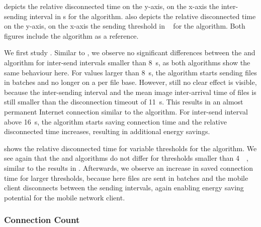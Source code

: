  depicts the relative disconnected time \relativeDisconnectedTime on the y-axis, on the x-axis the inter-sending interval in \si{\second} for the \algointerval algorithm. 
 also depicts the relative disconnected time on the y-axis, on the x-axis the sending threshold in \si{\mega\byte} for the \algosize algorithm. 
Both figures include the \algoimmediate algorithm as a reference.

We first study .
Similar to , we observe no significant differences between the \algointerval and \algoimmediate algorithm for inter-send intervals smaller than \SI{8}{\second}, as both algorithms show the same behaviour here.
For values larger than \SI{8}{\second}, the \algointerval algorithm starts sending files in batches and no longer on a per file base.
However, still no clear effect is visible, because the inter-sending interval and the mean image inter-arrival time of files is still smaller than the disconnection timeout of \SI{11}{\second}.
This results in an almost permanent Internet connection similar to the \algoimmediate algorithm.
For inter-send interval above \SI{16}{\second}, the \algointerval algorithm starts saving connection time and the relative disconnected time increases, resulting in additional energy savings.

 shows the relative disconnected time for variable thresholds for the \algosize algorithm.
We see again that the \algosize and \algoimmediate algorithms do not differ for thresholds smaller than \SI{4}{\mega\byte}, similar to the results in .
Afterwards, we observe an increase in saved connection time for larger thresholds, because here files are sent in batches and the mobile client disconnects between the sending intervals, again enabling energy saving potential for the mobile network client.

\subsubsection*{Connection Count}\label{sec:application:cloud_file_synchronisation:numerical_evaluation:connection_count}

